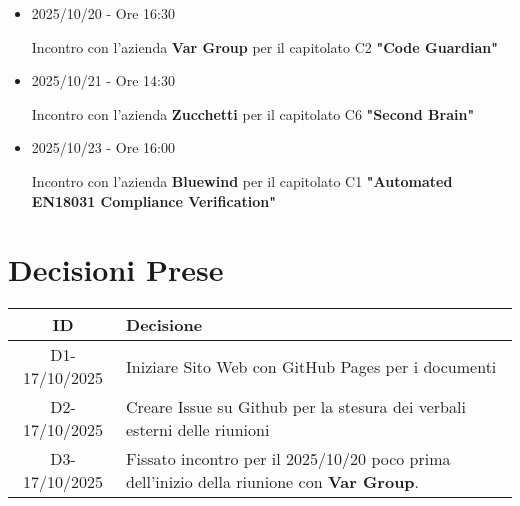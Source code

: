 \documentclass[a4paper,12pt]{article}
\begin{document}
{{        \begin{itemize}
            \item 2025/10/20 - Ore 16:30
            
            Incontro con l'azienda \textbf{Var Group} per il capitolato C2 \textbf{"Code Guardian"}
            \item 2025/10/21 - Ore 14:30
            
            Incontro con l'azienda \textbf{Zucchetti} per il capitolato C6 \textbf{"Second Brain"}
            \item 2025/10/23 - Ore 16:00
            
            Incontro con l'azienda \textbf{Bluewind} per il capitolato C1 \textbf{"Automated EN18031 Compliance Verification"}
        \end{itemize}
    }
}


\section{Decisioni Prese}{
    \begin{center}
    \begin{tabular}{|c|p{11cm}|}
        \hline
        \textbf{ID} & \textbf{Decisione} \\
        \hline
        D1-17/10/2025 & Iniziare Sito Web con GitHub Pages per i documenti \\
        \hline
        D2-17/10/2025 & Creare Issue su Github per la stesura dei verbali esterni delle riunioni \\
        \hline
        D3-17/10/2025 & Fissato incontro per il 2025/10/20 poco prima dell'inizio della riunione con \textbf{Var Group}. \\
        \hline
    \end{tabular}
    \end{center}
}
\end{document}
